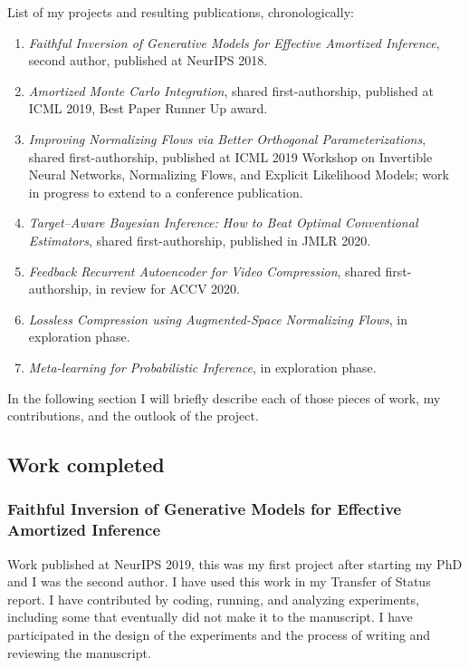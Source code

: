 \documentclass[12pt]{article}
\begin{document}
List of my projects and resulting publications, chronologically:
\begin{enumerate}
\item \emph{Faithful Inversion of Generative Models for Effective Amortized Inference}, second author, published at NeurIPS 2018. \citep{Webb2018faithful}
\item \emph{Amortized Monte Carlo Integration}, shared first-authorship, published at ICML 2019, Best Paper Runner Up award. \citep{Golinski2019amci}
\item \emph{Improving Normalizing Flows via Better Orthogonal Parameterizations}, shared first-authorship, published at ICML 2019 Workshop on Invertible Neural Networks, Normalizing Flows, and Explicit Likelihood Models; work in progress to extend to a conference publication. \citep{Golinski2019orthogonal}
\item \emph{Target–Aware Bayesian Inference: How to Beat Optimal Conventional Estimators}, shared first-authorship, published in JMLR 2020. \citep{Rainforth2020tabi}
\item \emph{Feedback Recurrent Autoencoder for Video Compression}, shared first-authorship, in review for ACCV 2020. \citep{Golinski2020feedback}
\item \emph{Lossless Compression using Augmented-Space Normalizing Flows}, in exploration phase.
\item \emph{Meta-learning for Probabilistic Inference}, in exploration phase.
\end{enumerate}

In the following section I will briefly describe each of those pieces of work, my contributions, and the outlook of the project.


\subsection{Work completed}

\subsubsection{Faithful Inversion of Generative Models for Effective Amortized Inference}%
Work published at NeurIPS 2019, this was my first project after starting my PhD and I was the second author.
I have used this work in my Transfer of Status report.
I have contributed by coding, running, and analyzing experiments, including some that eventually did not make it to the manuscript. 
I have participated in the design of the experiments and the process of writing and reviewing the manuscript.
\end{document}
